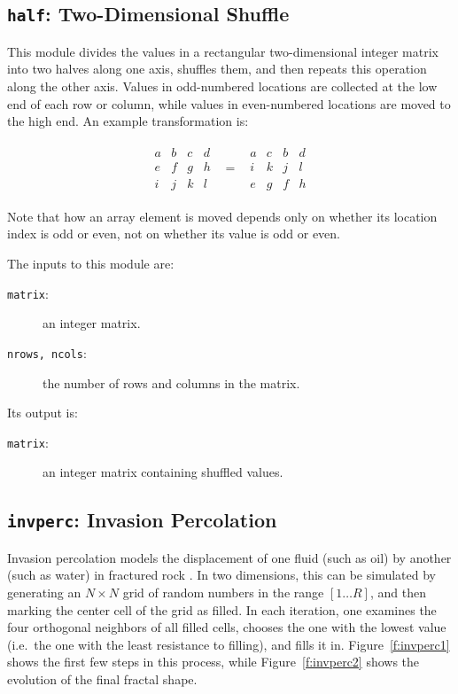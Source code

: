 \subsection{{\tt{half}}:
	Two-Dimensional Shuffle
	\label{s:toys-half}}

This module divides the values in a rectangular two-dimensional integer matrix into two halves along one axis,
shuffles them,
and then repeats this operation along the other axis.
Values in odd-numbered locations are collected at the low end of each row or column,
while values in even-numbered locations are moved to the high end.
An example transformation is:
\begin{small}
\begin{eqnarray*}
\begin{array}{cccc}
a & b & c & d \\
e & f & g & h \\
i & j & k & l
\end{array}
& = &
\begin{array}{cccc}
a & c & b & d \\
i & k & j & l \\
e & g & f & h
\end{array}
\end{eqnarray*}
\end{small}
Note that how an array element is moved depends only on whether its location index is odd or even,
not on whether its value is odd or even.

The inputs to this module are:
\begin{description}
\item[{\tt{matrix}}:]
	an integer matrix.
\item[{\tt{nrows, ncols}}:]
	the number of rows and columns in the matrix.
\end{description}
Its output is:
\begin{description}
\item[{\tt{matrix}}:]
	an integer matrix containing shuffled values.
\end{description}

\subsection{{\tt{invperc}}:
	Invasion Percolation
	\label{s:toys-invperc}}

Invasion percolation models the displacement of one fluid
(such as oil)
by another
(such as water)
in fractured rock \cite{b:percolation-theory,b:invasion-percolation}.
In two dimensions,
this can be simulated by generating
an $N{\times}N$ grid of random numbers in the range $[1{\ldots}R]$,
and then marking the center cell of the grid as filled.
In each iteration,
one examines the four orthogonal neighbors of all filled cells,
chooses the one with the lowest value
(i.e.\ the one with the least resistance to filling),
and fills it in.
Figure~\ref{f:invperc1} shows the first few steps in this process,
while Figure~\ref{f:invperc2} shows the evolution of the final fractal shape.

